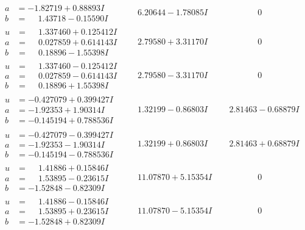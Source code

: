 \documentclass[1p]{elsarticle_modified}
\theoremstyle{definition}
\begin{document}
$$\begin{array}{c|c|c}
\begin{aligned}
a &= -1.82719 + 0.88893 I \\
b &= \phantom{-}1.43718 - 0.15590 I\end{aligned}
 & \phantom{-}6.20644 - 1.78085 I & \phantom{-0.000000 } 0 \\ \hline\begin{aligned}
u &= \phantom{-}1.337460 + 0.125412 I \\
a &= \phantom{-}0.027859 + 0.614143 I \\
b &= \phantom{-}0.18896 - 1.55398 I\end{aligned}
 & \phantom{-}2.79580 + 3.31170 I & \phantom{-0.000000 } 0 \\ \hline\begin{aligned}
u &= \phantom{-}1.337460 - 0.125412 I \\
a &= \phantom{-}0.027859 - 0.614143 I \\
b &= \phantom{-}0.18896 + 1.55398 I\end{aligned}
 & \phantom{-}2.79580 - 3.31170 I & \phantom{-0.000000 } 0 \\ \hline\begin{aligned}
u &= -0.427079 + 0.399427 I \\
a &= -1.92353 + 1.90314 I \\
b &= -0.145194 + 0.788536 I\end{aligned}
 & \phantom{-}1.32199 - 0.86803 I & \phantom{-}2.81463 - 0.68879 I \\ \hline\begin{aligned}
u &= -0.427079 - 0.399427 I \\
a &= -1.92353 - 1.90314 I \\
b &= -0.145194 - 0.788536 I\end{aligned}
 & \phantom{-}1.32199 + 0.86803 I & \phantom{-}2.81463 + 0.68879 I \\ \hline\begin{aligned}
u &= \phantom{-}1.41886 + 0.15846 I \\
a &= \phantom{-}1.53895 - 0.23615 I \\
b &= -1.52848 - 0.82309 I\end{aligned}
 & \phantom{-}11.07870 + 5.15354 I & \phantom{-0.000000 } 0 \\ \hline\begin{aligned}
u &= \phantom{-}1.41886 - 0.15846 I \\
a &= \phantom{-}1.53895 + 0.23615 I \\
b &= -1.52848 + 0.82309 I\end{aligned}
 & \phantom{-}11.07870 - 5.15354 I & \phantom{-0.000000 } 0 \\ \hline\begin{aligned}

\end{aligned}
\end{array}$$
\end{document}
